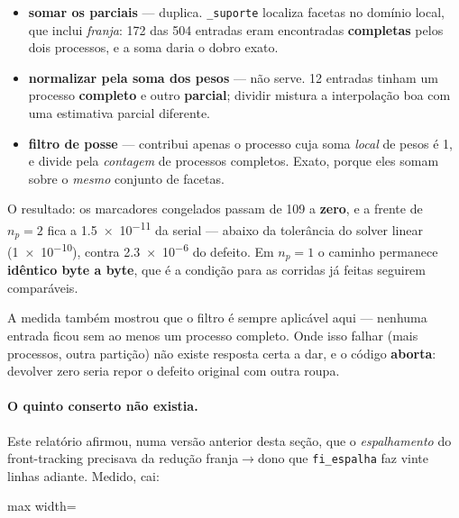 \begin{itemize}
  \item \textbf{somar os parciais} --- duplica. \texttt{\_suporte} localiza
    facetas no dom\'inio local, que inclui \emph{franja}: 172 das 504 entradas
    eram encontradas \textbf{completas} pelos dois processos, e a soma daria o
    dobro exato.
  \item \textbf{normalizar pela soma dos pesos} --- n\~ao serve. 12 entradas
    tinham um processo \textbf{completo} e outro \textbf{parcial}; dividir mistura
    a interpola\c{c}\~ao boa com uma estimativa parcial diferente.
  \item \textbf{filtro de posse} --- contribui apenas o processo cuja soma
    \emph{local} de pesos \'e 1, e divide pela \emph{contagem} de processos
    completos. Exato, porque eles somam sobre o \emph{mesmo} conjunto de facetas.
\end{itemize}

O resultado: os marcadores congelados passam de 109 a \textbf{zero}, e a frente de
$n_p=2$ fica a \num{1.5e-11} da serial --- abaixo da toler\^ancia do solver linear
(\num{1e-10}), contra \num{2.3e-6} do defeito. Em $n_p=1$ o caminho permanece
\textbf{id\^entico byte a byte}, que \'e a condi\c{c}\~ao para as corridas j\'a
feitas seguirem compar\'aveis.

A medida tamb\'em mostrou que o filtro \'e sempre aplic\'avel aqui --- nenhuma
entrada ficou sem ao menos um processo completo. Onde isso falhar (mais processos,
outra parti\c{c}\~ao) n\~ao existe resposta certa a dar, e o c\'odigo
\textbf{aborta}: devolver zero seria repor o defeito original com outra roupa.

\paragraph{O quinto conserto n\~ao existia.} Este relat\'orio afirmou, numa vers\~ao
anterior desta se\c{c}\~ao, que o \emph{espalhamento} do front-tracking precisava
da redu\c{c}\~ao franja$\to$dono que \texttt{fi\_espalha} faz vinte linhas adiante.
Medido, cai:

\begin{adjustbox}{max width=\linewidth}
\end{adjustbox}

